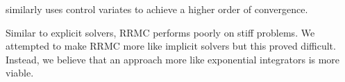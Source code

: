 \documentclass[a4paper,12pt]{article}
\begin{document}
\begin{related}[CV RRMC]
    \cite{daun_randomized_2011} similarly uses control variates to achieve
    a higher order of convergence.
\end{related}

Similar to explicit solvers, RRMC performs poorly on stiff problems.
We attempted to make RRMC more like implicit solvers but this proved difficult.
Instead, we believe that an approach more like exponential integrators
is more viable.








\end{document}
